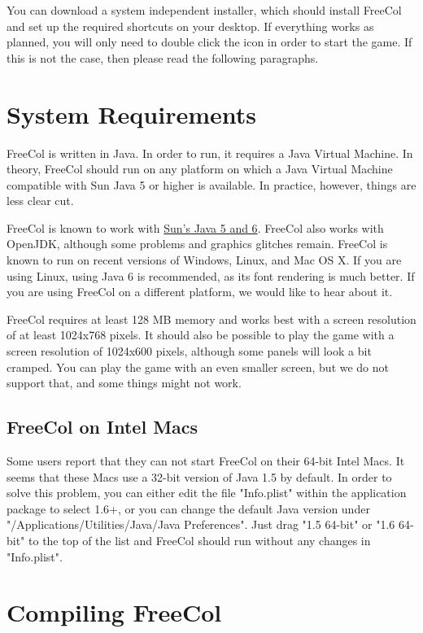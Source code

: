 \documentclass[12pt]{book}
\begin{document}
You can download a system independent installer, which should install
FreeCol and set up the required shortcuts on your desktop. If
everything works as planned, you will only need to double click the
icon in order to start the game. If this is not the case, then please
read the following paragraphs.

\hypertarget{System Requirements}{\section{System Requirements}}

FreeCol is written in Java. In order to run, it requires a Java
Virtual Machine. In theory, FreeCol should run on any platform on
which a Java Virtual Machine compatible with Sun Java 5 or higher is
available. In practice, however, things are less clear cut.

FreeCol is known to work with \href{http://java.sun.com/}{Sun's Java 5
  and 6}. FreeCol also works with OpenJDK, although some problems and
graphics glitches remain. FreeCol is known to run on recent versions
of Windows, Linux, and Mac OS X. If you are using Linux, using Java 6
is recommended, as its font rendering is much better. If you are using
FreeCol on a different platform, we would like to hear about it.

FreeCol requires at least 128 MB memory and works best with a screen
resolution of at least 1024x768 pixels. It should also be possible to
play the game with a screen resolution of 1024x600 pixels, although
some panels will look a bit cramped. You can play the game with an
even smaller screen, but we do not support that, and some things might
not work.

\hypertarget{FreeCol on Intel Macs}{\subsection{FreeCol on Intel Macs}}

Some users report that they can not start FreeCol on their 64-bit
Intel Macs. It seems that these Macs use a 32-bit version of Java 1.5
by default. In order to solve this problem, you can either edit the
file "Info.plist" within the application package to select 1.6+,
or you can change the default Java version under
"/Applications/Utilities/Java/Java Preferences".
Just drag "1.5 64-bit" or "1.6 64-bit" to the top of the list and
FreeCol should run without any changes in "Info.plist".


\hypertarget{Compiling FreeCol}{\section{Compiling FreeCol}}
\end{document}
